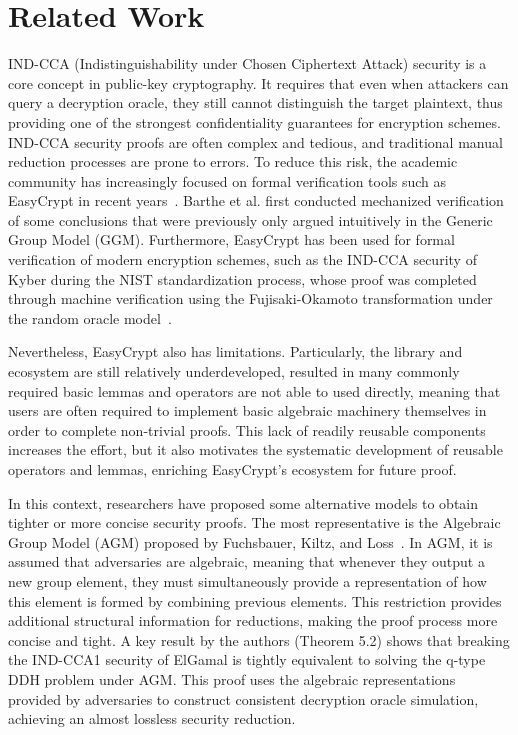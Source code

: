 \chapter{Related Work}\label{chap:relatedWork}

IND-CCA (Indistinguishability under Chosen Ciphertext Attack) security is a core concept in public-key cryptography. It requires that even when attackers can query a decryption oracle, they still cannot distinguish the target plaintext, thus providing one of the strongest confidentiality guarantees for encryption schemes. IND-CCA security proofs are often complex and tedious, and traditional manual reduction processes are prone to errors. To reduce this risk, the academic community has increasingly focused on formal verification tools such as EasyCrypt in recent years~\cite{easycrypt}. Barthe et al. first conducted mechanized verification of some conclusions that were previously only argued intuitively in the Generic Group Model (GGM). Furthermore, EasyCrypt has been used for formal verification of modern encryption schemes, such as the IND-CCA security of Kyber during the NIST standardization process, whose proof was completed through machine verification using the Fujisaki-Okamoto transformation under the random oracle model~\cite{kyber2024}.

Nevertheless, EasyCrypt also has limitations. Particularly, the library and ecosystem are still relatively underdeveloped, resulted in many commonly required basic lemmas and operators are not able to used directly, meaning that users are often required to implement basic algebraic machinery themselves in order to complete non-trivial proofs. This lack of readily reusable components increases the effort, but it also motivates the systematic development of reusable operators and lemmas, enriching EasyCrypt's ecosystem for future proof.

In this context, researchers have proposed some alternative models to obtain tighter or more concise security proofs. The most representative is the Algebraic Group Model (AGM) proposed by Fuchsbauer, Kiltz, and Loss~\cite{fuchsbauer2018}. In AGM, it is assumed that adversaries are algebraic, meaning that whenever they output a new group element, they must simultaneously provide a representation of how this element is formed by combining previous elements. This restriction provides additional structural information for reductions, making the proof process more concise and tight. A key result by the authors (Theorem 5.2) shows that breaking the IND-CCA1 security of ElGamal is tightly equivalent to solving the q-type DDH problem under AGM. This proof uses the algebraic representations provided by adversaries to construct consistent decryption oracle simulation, achieving an almost lossless security reduction.

